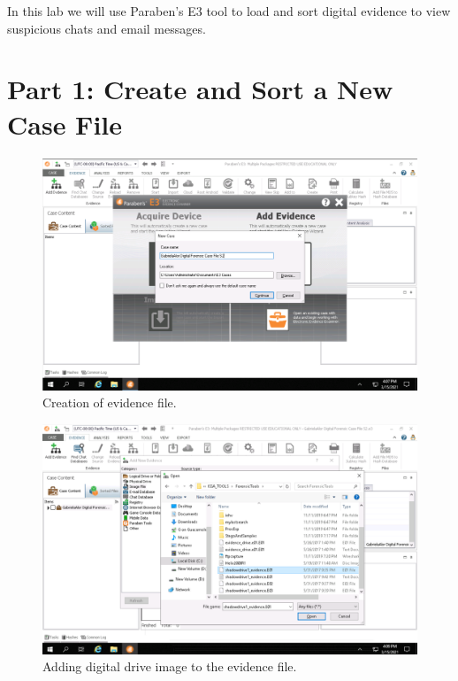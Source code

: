 In this lab we will use Paraben's E3 tool to load and sort digital evidence to view suspicious chats and email messages.

\section*{Part 1: Create and Sort a New Case File}
\begin{figure}[H]
    \centering
    \includegraphics[width=\linewidth]{figures/1-2.png}
    \caption{Creation of evidence file.}
\end{figure}

\begin{figure}[H]
    \centering
    \includegraphics[width=\linewidth]{figures/1-3.png}
    \caption{Adding digital drive image to the evidence file.}
\end{figure}

